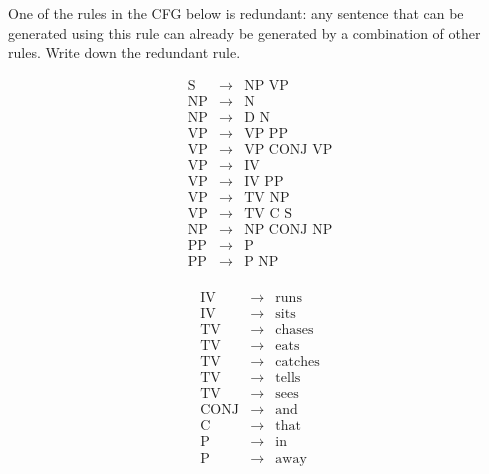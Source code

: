 \documentclass[12pt]{article}
\newcommand{\nlcfgrule}[2]{\textrm{#1} & \rightarrow & \textrm{#2} \nonumber}
\begin{document}
\begin{exe}
\begin{xlist}
\begin{comment}
\noindent Notice that the tree constructed using the leftmost derivation is identical
to the tree constructed using the rightmost derivation
\end{soln}

 }
\end{comment}

\end{xlist}

\bigskip
\ex\label{nlg}

One of the rules in the CFG below is redundant: any sentence that
can be generated using this rule can already be generated by a
combination of other rules. Write down the redundant rule.

\begin{minipage}[t]{5cm}
\begin{eqnarray*}
\nlcfgrule{S}{NP\ VP}\\
\nlcfgrule{NP}{N}\\
\nlcfgrule{NP}{D\ N}\\
\nlcfgrule{VP}{VP\ PP}\\
\nlcfgrule{VP}{VP\ CONJ\ VP}\\
\nlcfgrule{VP}{IV}\\
\nlcfgrule{VP}{IV\ PP}\\
\nlcfgrule{VP}{TV\ NP}\\
\nlcfgrule{VP}{TV\ C\ S}\\
\nlcfgrule{NP}{NP\ CONJ\ NP}\\
\nlcfgrule{PP}{P}\\
\nlcfgrule{PP}{P\ NP}\\
\end{eqnarray*}
\end{minipage}
\begin{minipage}[t]{5cm}
\begin{eqnarray*}
\nlcfgrule{IV}{runs}\\
\nlcfgrule{IV}{sits}\\
\nlcfgrule{TV}{chases}\\
\nlcfgrule{TV}{eats}\\
\nlcfgrule{TV}{catches}\\
\nlcfgrule{TV}{tells}\\
\nlcfgrule{TV}{sees}\\
\nlcfgrule{CONJ}{and}\\
\nlcfgrule{C}{that}\\
\nlcfgrule{P}{in}\\
\nlcfgrule{P}{away}\\
\end{eqnarray*}

\end{minipage}
\end{exe}
\end{document}
